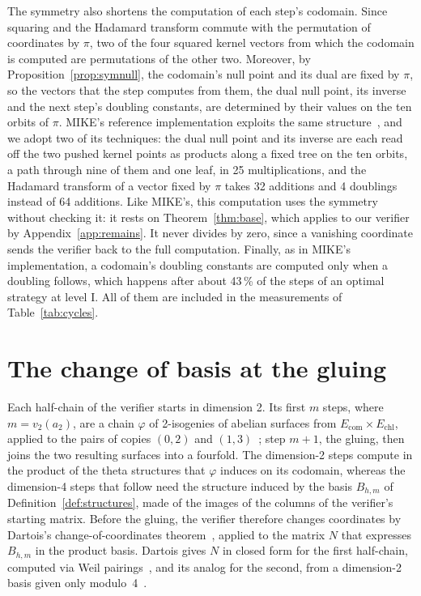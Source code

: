 \documentclass[version=preprint]{iacrcc}
\newcommand{\Ecom}{E_{\mathrm{com}}}
\newcommand{\Echl}{E_{\mathrm{chl}}}
\begin{document}
    The symmetry also shortens the computation of each step's codomain. Since
    squaring and the Hadamard transform commute with the permutation of
    coordinates by $\pi$, two of the four squared kernel vectors from which the
    codomain is computed are permutations of the other two. Moreover, by
    Proposition~\ref{prop:symnull}, the codomain's null point and its dual are
    fixed by $\pi$, so the vectors that the step computes from them, the dual
    null point, its inverse and the next step's doubling constants, are
    determined by their values on the ten orbits of $\pi$. MIKE's reference
    implementation exploits the same structure~\cite{BDD+26}, and we adopt two
    of its techniques: the dual null point and its inverse are each read off the
    two pushed kernel points as products along a fixed tree on the ten orbits,
    a path through nine of them and one leaf, in 25 multiplications, and the
    Hadamard transform of a vector fixed by $\pi$ takes 32 additions and 4
    doublings instead of 64 additions. Like MIKE's, this computation uses
    the symmetry without checking it: it rests on Theorem~\ref{thm:base}, which
    applies to our verifier by Appendix~\ref{app:remains}. It never divides by zero, since a vanishing
    coordinate sends the verifier back to the full computation. Finally, as in
    MIKE's implementation, a codomain's doubling constants are computed only
    when a doubling follows, which happens after about 43\,\% of the steps of an
    optimal strategy at level I. All of them are included in the measurements of
    Table~\ref{tab:cycles}.

    \section{The change of basis at the gluing}
    \label{sec:gluing}

    Each half-chain of the verifier starts in dimension 2. Its first $m$
    steps, where $m = v_2(a_2)$, are a chain $\varphi$ of 2-isogenies of abelian
    surfaces from $\Ecom \times \Echl$, applied to the pairs of copies $(0, 2)$
    and $(1, 3)$~\cite[Lemmas 23 and 28]{Dar24}; step $m + 1$, the gluing, then
    joins the two resulting surfaces into a fourfold. The dimension-2 steps
    compute in the product of the theta structures that $\varphi$ induces on
    its codomain, whereas the dimension-4 steps that follow need the structure
    induced by the basis $B_{h,m}$ of Definition~\ref{def:structures}, made of
    the images of the columns of the verifier's starting matrix. Before the
    gluing, the verifier therefore changes coordinates by Dartois's
    change-of-coordinates theorem~\cite[Theorem 12]{Dar24}, applied to the matrix
    $N$ that expresses $B_{h,m}$ in the product basis. Dartois gives $N$ in
    closed form for the first half-chain, computed via Weil
    pairings~\cite[Lemma 30]{Dar24}, and its analog for the second, from a
    dimension-2 basis given only modulo~4~\cite[Lemma 31 and Appendix
    C.1]{Dar24}.
\end{document}

